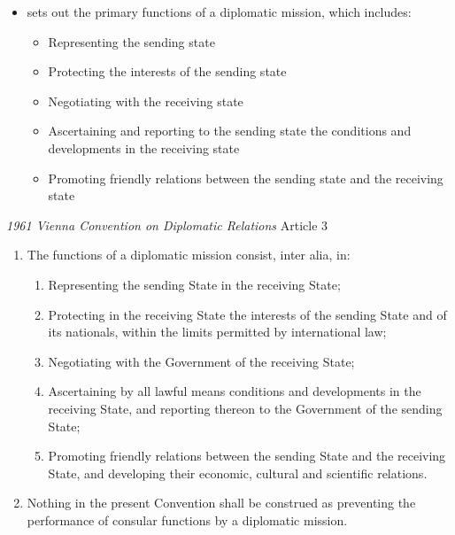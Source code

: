 \begin{itemize}
    \item {} sets out the primary functions of a diplomatic mission, which includes:
    \begin{itemize}
        \item Representing the sending state
        \item Protecting the interests of the sending state
        \item Negotiating with the receiving state
        \item Ascertaining and reporting to the sending state the conditions and developments in the receiving state
        \item Promoting friendly relations between the sending state and the receiving state
    \end{itemize}
\end{itemize}

\begin{conventiondetails}{\textit{1961 Vienna Convention on Diplomatic Relations} Article 3}
    \flushleft
    \begin{enumerate}
        \item The functions of a diplomatic mission consist, inter alia, in:
        \begin{enumerate}
            \item Representing the sending State in the receiving State;
            \item Protecting in the receiving State the interests of the sending State and of its nationals, within the limits permitted by international law;
            \item Negotiating with the Government of the receiving State;
            \item Ascertaining by all lawful means conditions and developments in the receiving State, and reporting thereon to the Government of the sending State;
            \item Promoting friendly relations between the sending State and the receiving State, and developing their economic, cultural and scientific relations.
        \end{enumerate}
        \item  Nothing in the present Convention shall be construed as preventing the performance of consular functions by a diplomatic mission.
    \end{enumerate}
\end{conventiondetails}

